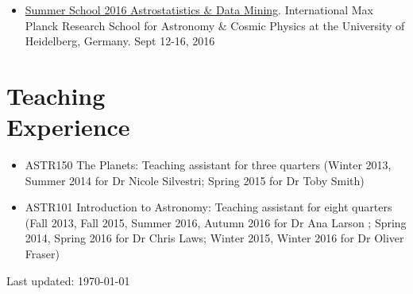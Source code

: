 \documentclass[margin]{res}
\begin{document}
\begin{resume}
\begin{itemize}
	\item \href{https://www.imprs-hd.mpg.de/147422/Summer-School-2016}{Summer School 2016 Astrostatistics \& Data Mining}. International Max Planck Research School for Astronomy \& Cosmic Physics at the University of Heidelberg, Germany. Sept 12-16, 2016

\end{itemize}


\section{Teaching \\Experience}
\begin{itemize}   
	
\item ASTR150 The Planets: Teaching assistant for  three quarters (Winter 2013, Summer 2014 for Dr Nicole Silvestri; Spring 2015 for Dr Toby Smith)

\item ASTR101 Introduction to Astronomy: Teaching assistant for  eight quarters (Fall 2013, Fall 2015, Summer 2016, Autumn 2016 for Dr Ana Larson ; Spring 2014, Spring 2016 for Dr Chris Laws; Winter 2015, Winter 2016 for Dr Oliver Fraser) \\
\end{itemize}



\vfill \hfill {\small Last updated: \today}
\end{resume}
\end{document}
